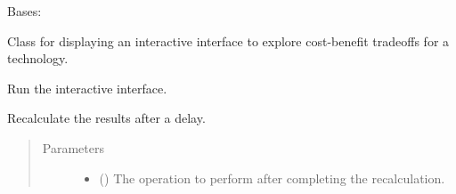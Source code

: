 \documentclass[letterpaper,10pt,english]{sphinxmanual}
\begin{document}
\begin{fulllineitems}
\label{\detokenize{tyche:tyche.DecisionGUI.DecisionWindow}}
Bases: 

Class for displaying an interactive interface to explore cost-benefit tradeoffs for a technology.

\begin{fulllineitems}
\label{\detokenize{tyche:tyche.DecisionGUI.DecisionWindow.create_figure}}
\end{fulllineitems}


\begin{fulllineitems}
\label{\detokenize{tyche:tyche.DecisionGUI.DecisionWindow.mainloop}}
Run the interactive interface.

\end{fulllineitems}


\begin{fulllineitems}
\label{\detokenize{tyche:tyche.DecisionGUI.DecisionWindow.reevaluate}}
Recalculate the results after a delay.
\begin{quote}\begin{description}
\item[{Parameters}] \leavevmode\begin{itemize}
\item {} 
 () \textendash{} The operation to perform after completing the recalculation.


\end{itemize}
\end{description}
\end{quote}
\end{fulllineitems}
\end{fulllineitems}
\end{document}
